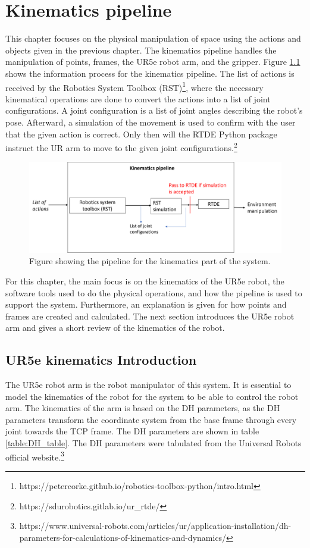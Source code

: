 \chapter{Kinematics pipeline}\label{ch:Kinematics_intro}
This chapter focuses on the physical manipulation of space using the actions and objects given in the previous chapter. The kinematics pipeline handles the manipulation of points, frames, the UR5e robot arm, and the gripper. Figure \ref{fig:kin_pipeline} shows the information process for the kinematics pipeline. The list of actions is received by the Robotics System Toolbox (RST)\footnote{https://petercorke.github.io/robotics-toolbox-python/intro.html}, where the necessary kinematical operations are done to convert the actions into a list of joint configurations. A joint configuration is a list of joint angles describing the robot's pose. Afterward, a simulation of the movement is used to confirm with the user that the given action is correct. Only then will the RTDE Python package instruct the UR arm to move to the given joint configurations.\footnote{https://sdurobotics.gitlab.io/ur\_rtde/} 

\begin{figure}[ht]
    \centering
    \includegraphics[width=15cm]{img/kinematics_pipeline.png}
    \caption{Figure showing the pipeline for the kinematics part of the system.}
    \label{fig:kin_pipeline}
\end{figure}

For this chapter, the main focus is on the kinematics of the UR5e robot, the software tools used to do the physical operations, and how the pipeline is used to support the system. Furthermore, an explanation is given for how points and frames are created and calculated. The next section introduces the UR5e robot arm and gives a short review of the kinematics of the robot.


\section{UR5e kinematics Introduction}\label{sec:Kinematics_kin_intro}
The UR5e robot arm is the robot manipulator of this system. It is essential to model the kinematics of the robot for the system to be able to control the robot arm. The kinematics of the arm is based on the DH parameters, as the DH parameters transform the coordinate system from the base frame through every joint towards the TCP frame. The DH parameters are shown in table \ref{table:DH_table}. The DH parameters were tabulated from the Universal Robots official website.\footnote{https://www.universal-robots.com/articles/ur/application-installation/dh-parameters-for-calculations-of-kinematics-and-dynamics/}


